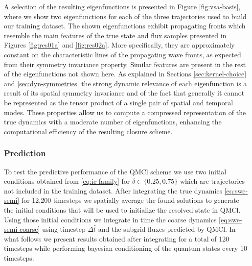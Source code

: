 \documentclass[letterpaper,10pt,3p,preprint]{elsarticle}
\begin{document}
A selection of the resulting eigenfunctions is presented in
Figure \ref{fig:vsa-basis},
where we show two eigenfunctions for each of the three
trajectories used to build our training dataset.
The shown eigenfunctions exhibit propagating fronts
which resemble the main features of the true state and flux
samples presented in Figures
\ref{fig:res01a} and \ref{fig:res02a}.
More specifically, they are approximately constant on the
characteristic lines of the propagating wave fronts,
as expected from their symmetry invariance property.
Similar features are present in the rest of the eigenfunctions
not shown here.
As explained in Sections
\ref{sec:kernel-choice} and \ref{sec:dyn-symmetries}
the strong dynamic relevance of each eigenfunction is a result
of its spatial symmetry invariance and of
the fact that generally it cannot be represented as the tensor
product of a single pair of spatial and temporal modes.
These properties allow us to compute a compressed representation
of the true dynamics with a moderate number of eigenfunctions,
enhancing the computational efficiency of the resulting closure
scheme.

\subsubsection*{Prediction}
To test the predictive performance of the QMCl scheme we use two
initial conditions obtained from \eqref{eq:ic-family}
for $\delta\in\{0.25,0.75\}$
which are trajectories not included in the training dataset.
After integrating the true dynamics \eqref{eq:swe-semi}
for 12,200 timesteps we spatially average the found solutions
to generate the initial conditions that will be used to initialize
the resolved state in QMCl.
Using those initial conditions we integrate in time the coarse
dynamics \eqref{eq:swe-semi-coarse} using timestep $\Delta\hat{t}$
and the subgrid fluxes predicted by QMCl.
In what follows we present results obtained after integrating for
a total of 120 timesteps while performing bayesian conditioning
of the quantum states every 10 timesteps.
\end{document}
